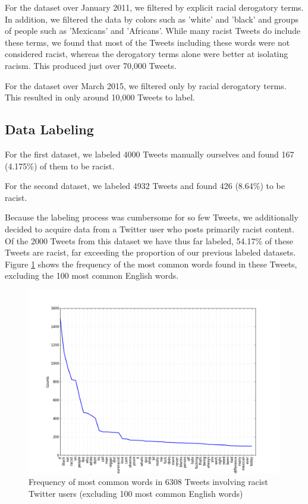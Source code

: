 \documentclass[]{article}
\begin{document}
For the dataset over January 2011, we filtered by explicit racial derogatory terms. In addition, we filtered the data by colors such as 'white' and 'black' and groups of people such as 'Mexicans' and 'Africans'. While many racist Tweets do include these terms, we found that most of the Tweets including these words were not considered racist, whereas the derogatory terms alone were better at isolating racism. This produced just over 70,000 Tweets.

For the dataset over March 2015, we filtered only by racial derogatory terms. This resulted in only around 10,000 Tweets to label.

\subsection{Data Labeling}

For the first dataset, we labeled 4000 Tweets manually ourselves and found 167 (4.175\%) of them to be racist.

For the second dataset, we labeled 4932 Tweets and found 426 (8.64\%) to be racist.

Because the labeling process was cumbersome for so few Tweets, we additionally decided to acquire data from a Twitter user who posts primarily racist content. Of the 2000 Tweets from this dataset we have thus far labeled, 54.17\% of these Tweets are racist, far exceeding the proportion of our previous labeled datasets. Figure \ref{fig:word_count} shows the frequency of the most common words found in these Tweets, excluding the 100 most common English words.

\begin{figure}[h]
\label{fig:word_count}
\caption{Frequency of most common words in 6308 Tweets involving racist Twitter users (excluding 100 most common English words)}
\includegraphics[width=13cm]{word_count}
\centering
\end{figure}
\end{document}
